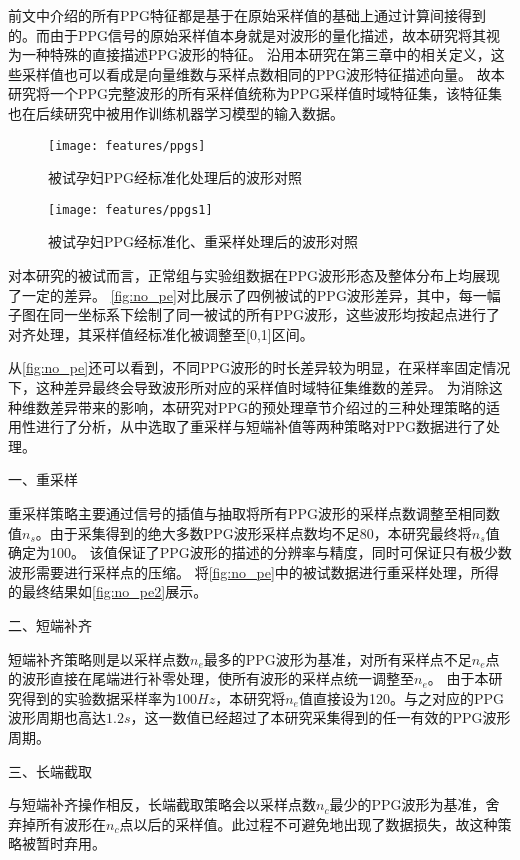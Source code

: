 前文中介绍的所有PPG特征都是基于在原始采样值的基础上通过计算间接得到的。而由于PPG信号的原始采样值本身就是对波形的量化描述，故本研究将其视为一种特殊的直接描述PPG波形的特征。
沿用本研究在第三章中的相关定义，这些采样值也可以看成是向量维数与采样点数相同的PPG波形特征描述向量。
故本研究将一个PPG完整波形的所有采样值统称为PPG采样值时域特征集，该特征集也在后续研究中被用作训练机器学习模型的输入数据。

\begin{figure}[htbp]
  \centering
  \texttt{[image: features/ppgs]}
  \caption{\label{fig:no_pe}被试孕妇PPG经标准化处理后的波形对照}
\end{figure}

\begin{figure}[htbp]
  \centering
  \texttt{[image: features/ppgs1]}
  \caption{\label{fig:no_pe2}被试孕妇PPG经标准化、重采样处理后的波形对照}
\end{figure}

对本研究的被试而言，正常组与实验组数据在PPG波形形态及整体分布上均展现了一定的差异。
\autoref{fig:no_pe}对比展示了四例被试的PPG波形差异，其中，每一幅子图在同一坐标系下绘制了同一被试的所有PPG波形，这些波形均按起点进行了对齐处理，其采样值经标准化被调整至[0,1]区间。

从\autoref{fig:no_pe}还可以看到，不同PPG波形的时长差异较为明显，在采样率固定情况下，这种差异最终会导致波形所对应的采样值时域特征集维数的差异。
为消除这种维数差异带来的影响，本研究对PPG的预处理章节介绍过的三种处理策略的适用性进行了分析，从中选取了重采样与短端补值等两种策略对PPG数据进行了处理。

一、重采样

重采样策略主要通过信号的插值与抽取将所有PPG波形的采样点数调整至相同数值$n_s$。由于采集得到的绝大多数PPG波形采样点数均不足80，本研究最终将$n_s$值确定为100。
该值保证了PPG波形的描述的分辨率与精度，同时可保证只有极少数波形需要进行采样点的压缩。
将\autoref{fig:no_pe}中的被试数据进行重采样处理，所得的最终结果如\autoref{fig:no_pe2}展示。

二、短端补齐

短端补齐策略则是以采样点数$n_e$最多的PPG波形为基准，对所有采样点不足$n_e$点的波形直接在尾端进行补零处理，使所有波形的采样点统一调整至$n_e$。
由于本研究得到的实验数据采样率为100$Hz$，本研究将$n_e$值直接设为120。与之对应的PPG波形周期也高达$1.2 s$，这一数值已经超过了本研究采集得到的任一有效的PPG波形周期。

三、长端截取

与短端补齐操作相反，长端截取策略会以采样点数$n_c$最少的PPG波形为基准，舍弃掉所有波形在$n_c$点以后的采样值。此过程不可避免地出现了数据损失，故这种策略被暂时弃用。

